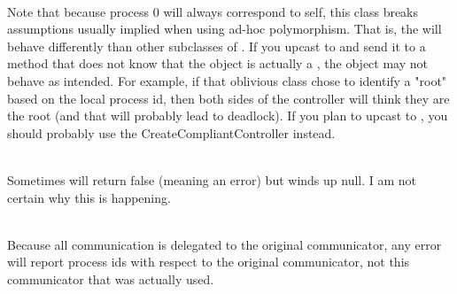 \begin{DoxyRefList}
\item[{\parbox[t]{\linewidth}{Class \doxylink{classvtk_socket_controller}{vtk\+Socket\+Controller} }}]\hfill \\
\label{bug__bug000006}%
%
 Note that because process 0 will always correspond to self, this class breaks assumptions usually implied when using ad-\/hoc polymorphism. That is, the  will behave differently than other subclasses of . If you upcast  to  and send it to a method that does not know that the object is actually a , the object may not behave as intended. For example, if that oblivious class chose to identify a "{}root"{} based on the local process id, then both sides of the controller will think they are the root (and that will probably lead to deadlock). If you plan to upcast to , you should probably use the Create\+Compliant\+Controller instead. 
\item[{\parbox[t]{\linewidth}{Class \doxylink{classvtk_s_q_lite_query}{vtk\+SQLite\+Query} }}]\hfill \\
\label{bug__bug000007}%
%
 Sometimes  will return false (meaning an error) but  winds up null. I am not certain why this is happening. 
\item[{\parbox[t]{\linewidth}{Class \doxylink{classvtk_sub_communicator}{vtk\+Sub\+Communicator} }}]\hfill \\
\label{bug__bug000008}%
%
 Because all communication is delegated to the original communicator, any error will report process ids with respect to the original communicator, not this communicator that was actually used.
\end{DoxyRefList}